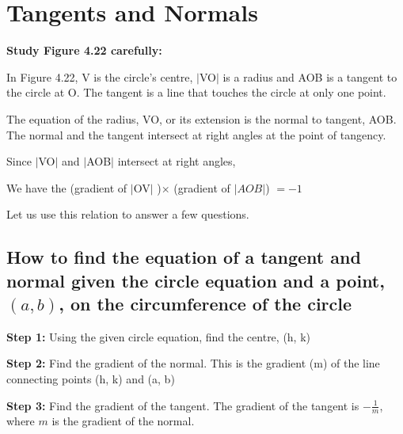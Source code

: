 \section{Tangents and Normals}

\begin{center}
\textbf{\color{sectionblue} Study Figure 4.22 carefully:}
\end{center}
\begin{center}
\end{center}

In Figure 4.22, V is the circle's centre, $|$VO$|$ is a radius and AOB is a tangent to the
circle at O. The tangent is a line that touches the circle at only one point.

The equation of the radius, VO, or its extension is the normal to tangent, AOB.
The normal and the tangent intersect at right angles at the point of tangency.

Since $|$VO$|$ and $|$AOB$|$ intersect at right angles,

We have the (gradient of $|$OV$|$ )$\times$ (gradient of $|AOB|$) $= -1$

Let us use this relation to answer a few questions.

\subsection{How to find the equation of a tangent and normal given the circle
equation and a point, $(a, b)$, on the circumference of the circle}

\textbf{Step 1:} Using the given circle equation, find the centre, (h, k)

\textbf{Step 2:} Find the gradient of the normal. This is the gradient (m) of the line
connecting points (h, k) and (a, b)

\textbf{Step 3:} Find the gradient of the tangent. The gradient of the tangent is $-\frac{1}{m}$, where
$m$ is the gradient of the normal.

